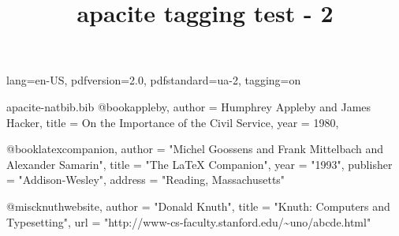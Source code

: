\DocumentMetadata
  {
    lang=en-US,
    pdfversion=2.0,
    pdfstandard=ua-2,
    tagging=on
  }
\begin{filecontents}[noheader]{apacite-natbib.bib}
@book{appleby,
  author  = {Humphrey Appleby and James Hacker},
  title   = {On the Importance of the Civil Service},
  year    = {1980},
}

@book{latexcompanion,
    author    = "Michel Goossens and Frank Mittelbach and Alexander Samarin",
    title     = "The LaTeX Companion",
    year      = "1993",
    publisher = "Addison-Wesley",
    address   = "Reading, Massachusetts"
}

@misc{knuthwebsite,
    author    = "Donald Knuth",
    title     = "Knuth: Computers and Typesetting",
    url       = "http://www-cs-faculty.stanford.edu/\~{}uno/abcde.html"
}
\end{filecontents}

\documentclass{article}

\usepackage[natbibapa]{apacite}
\usepackage{hyperref}

\title{apacite tagging test - 2}


\tableofcontents
\section{A section}

\citep[p.~11]{appleby,latexcompanion}

\citet[p.~11]{appleby,latexcompanion}


\citeyear[p.~11]{appleby,latexcompanion}






